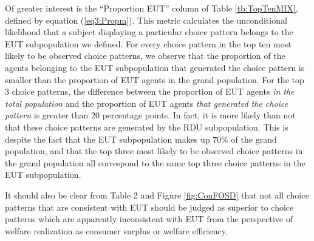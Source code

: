 \documentclass[../main.tex]{subfiles}
\begin{document}
Of greater interest is the \enquote{Proportion EUT} column of Table \ref{tb:TopTenMIX}, defined by equation (\ref{eq3:Propm}).
This metric calculates the unconditional likelihood that a subject displaying a particular choice pattern belongs to the EUT subpopulation we defined.
For every choice pattern in the top ten most likely to be observed choice patterns, we observe that the proportion of the agents belonging to the EUT subpopulation that generated the choice pattern is smaller than the proportion of EUT agents in the grand population.
For the top 3 choice patterns, the difference between the proportion of EUT agents \textit{in the total population} and the proportion of EUT agents \textit{that generated the choice pattern} is greater than 20 percentage points.
In fact, it is more likely than not that these choice patterns are generated by the RDU subpopulation.
This is despite the fact that the EUT subpopulation makes up $70\%$ of the grand population, and that the top three most likely to be observed choice patterns in the grand population all correspond to the same top three choice patterns in the EUT subpopulation.



It should also be clear from Table 2 and Figure \ref{fig:ConFOSD} that not all choice patterns that are consistent with EUT should be judged as superior to choice patterns which are apparently inconsistent with EUT from the perspective of welfare realization as consumer surplus or welfare efficiency.
\end{document}
